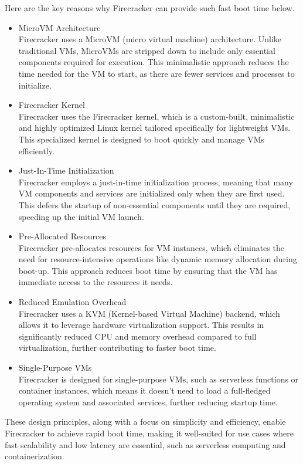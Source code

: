 \documentclass[conference]{IEEEtran}
\begin{document}
Here are the key reasons why Firecracker can provide such fast boot time below.
\begin{itemize}
	\item MicroVM Architecture\\
		Firecracker uses a MicroVM (micro virtual machine) architecture. Unlike traditional VMs, MicroVMs are stripped down to include only essential components required for execution. This minimalistic approach reduces the time needed for the VM to start, as there are fewer services and processes to initialize.
	\item Firecracker Kernel\\
		Firecracker uses the Firecracker kernel, which is a custom-built, minimalistic and highly optimized Linux kernel tailored specifically for lightweight VMs. This specialized kernel is designed to boot quickly and manage VMs efficiently.
	\item Just-In-Time Initialization\\
		Firecracker employs a just-in-time initialization process, meaning that many VM components and services are initialized only when they are first used. This defers the startup of non-essential components until they are required, speeding up the initial VM launch.
	\item Pre-Allocated Resources\\
		Firecracker pre-allocates resources for VM instances, which eliminates the need for resource-intensive operations like dynamic memory allocation during boot-up. This approach reduces boot time by ensuring that the VM has immediate access to the resources it needs.
	\item Reduced Emulation Overhead\\
		Firecracker uses a KVM (Kernel-based Virtual Machine) backend, which allows it to leverage hardware virtualization support. This results in significantly reduced CPU and memory overhead compared to full virtualization, further contributing to faster boot time.
	\item Single-Purpose VMs\\
		Firecracker is designed for single-purpose VMs, such as serverless functions or container instances, which means it doesn't need to load a full-fledged operating system and associated services, further reducing startup time.
\end{itemize}
These design principles, along with a focus on simplicity and efficiency, enable Firecracker to achieve rapid boot time, making it well-suited for use cases where fast scalability and low latency are essential, such as serverless computing and containerization.
\end{document}
